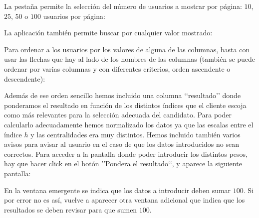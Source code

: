 
La pestaña permite la selección del número de usuarios a mostrar por página: 
$10$, $25$, $50$ o $100$ usuarios por página:


La aplicación también permite buscar por cualquier valor mostrado:


Para ordenar a los usuarios por los valores de alguna de las columnas, basta 
con usar las flechas que hay al lado de los nombres de las columnas (también se 
puede ordenar por varias columnas y con diferentes criterios, orden ascendente o descendente):



Además de ese orden sencillo hemos incluido una columna \lq\lq resultado\rq\rq 
donde ponderamos el resultado en función de los distintos índices que el cliente 
escoja como más relevantes para la selección adecuada del 
candidato. Para poder calcularlo adecuadamente hemos normalizado los datos ya que las escalas 
entre el índice $h$ y las centralidades era muy distintos. Hemos incluido también varios 
avisos para avisar al usuario en el caso de que los datos introducidos no sean correctos.
Para acceder a la pantalla donde poder introducir los distintos pesos, hay que hacer
click en el botón \rq\rq  Pondera el resultado\lq\lq, y aparece la siguiente pantalla:


En la ventana emergente se indica que los datos a introducir deben sumar $100$. Si por error no 
es así, vuelve a aparecer otra ventana adicional que indica que los resultados se deben revisar 
para que sumen $100$. 

